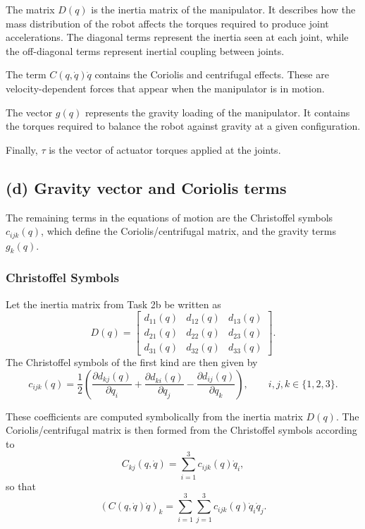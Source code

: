 \documentclass{article}
\begin{document}
The matrix \(D(q)\) is the inertia matrix of the manipulator. It describes how the mass distribution of the robot affects the torques required to produce joint accelerations. The diagonal terms represent the inertia seen at each joint, while the off-diagonal terms represent inertial coupling between joints.

The term \(C(q,\dot q)\dot q\) contains the Coriolis and centrifugal effects. These are velocity-dependent forces that appear when the manipulator is in motion.

The vector \(g(q)\) represents the gravity loading of the manipulator. It contains the torques required to balance the robot against gravity at a given configuration.

Finally, \(\tau\) is the vector of actuator torques applied at the joints.

\subsection*{(d) Gravity vector and Coriolis terms}

The remaining terms in the equations of motion are the Christoffel symbols \(c_{ijk}(q)\), which define the Coriolis/centrifugal matrix, and the gravity terms \(g_k(q)\).

\subsubsection*{Christoffel Symbols}

Let the inertia matrix from Task 2b be written as
\[
D(q)=
\begin{bmatrix}
d_{11}(q) & d_{12}(q) & d_{13}(q)\\
d_{21}(q) & d_{22}(q) & d_{23}(q)\\
d_{31}(q) & d_{32}(q) & d_{33}(q)
\end{bmatrix}.
\]
The Christoffel symbols of the first kind are then given by
\[
c_{ijk}(q)
=
\frac{1}{2}
\left(
\frac{\partial d_{kj}(q)}{\partial q_i}
+
\frac{\partial d_{ki}(q)}{\partial q_j}
-
\frac{\partial d_{ij}(q)}{\partial q_k}
\right),
\qquad i,j,k\in\{1,2,3\}.
\]

These coefficients are computed symbolically from the inertia matrix \(D(q)\). The Coriolis/centrifugal matrix is then formed from the Christoffel symbols according to
\[
C_{kj}(q,\dot q)=\sum_{i=1}^{3} c_{ijk}(q)\dot q_i,
\]
so that
\[
\left(C(q,\dot q)\dot q\right)_k
=
\sum_{i=1}^{3}\sum_{j=1}^{3} c_{ijk}(q)\dot q_i\dot q_j.
\]
\end{document}
